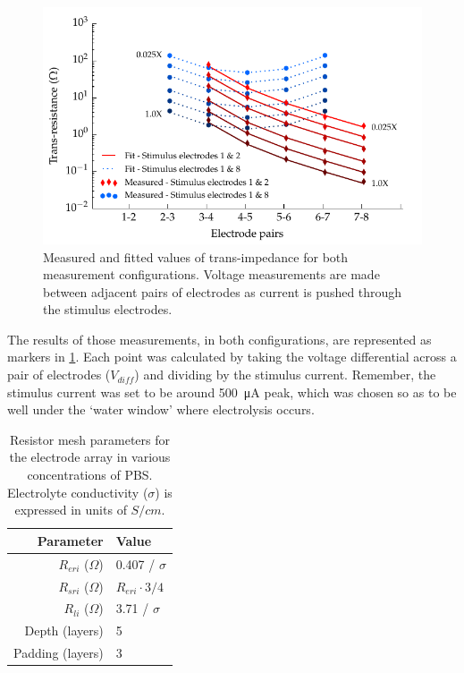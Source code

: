       \begin{figure}
        \centering
        \includegraphics{content/pt2/07-InterfaceModel/graphics/graph_transimpedance_pbs}
        \caption{\label{fig:pt2-graph_transimpedance_pbs}Measured and fitted values of trans-impedance for both measurement configurations. Voltage measurements are made between adjacent pairs of electrodes as current is pushed through the stimulus electrodes.}
      \end{figure}
      The results of those measurements, in both configurations, are represented as markers in \cref{fig:pt2-graph_transimpedance_pbs}.
      Each point was calculated by taking the voltage differential across a pair of electrodes ($V_{diff}$) and dividing by the stimulus current.
      Remember, the stimulus current was set to be around \SI{500}{\micro\ampere} peak, which was chosen so as to be well under the `water window' where electrolysis occurs.
      \begin{table}
        \centering
        \begin{tabular}{r | l}
          Parameter & Value \\
          \hline
          $R_{eri}$ ($\Omega$)& 0.407 / $\sigma$\\
          $R_{sri}$ ($\Omega$)& $R_{eri}\cdot 3/4$\\
          $R_{li}$ ($\Omega$)& 3.71 / $\sigma$ \\
          Depth (layers) & 5 \\
          Padding (layers) & 3 \\
        \end{tabular}
        \caption{\label{tab:RESparams}Resistor mesh parameters for the electrode array in various concentrations of PBS. Electrolyte conductivity ($\sigma$) is expressed in units of $S / cm$.}
      \end{table}

